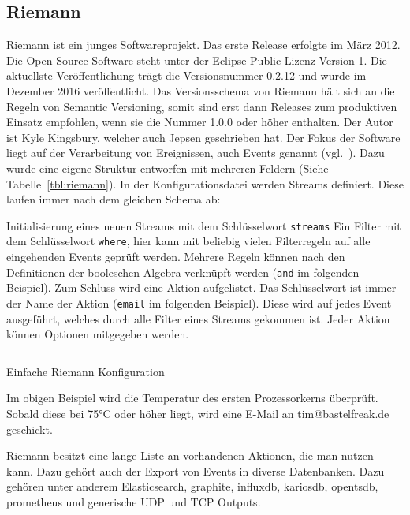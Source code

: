\subsection{Riemann}
Riemann ist ein junges Softwareprojekt. Das erste Release erfolgte im März
2012. Die Open-Source-Software steht unter der Eclipse Public Lizenz Version 1.
Die aktuellste Veröffentlichung trägt die Versionsnummer 0.2.12 und wurde im
Dezember 2016 veröffentlicht. Das Versionsschema von Riemann hält sich an die
Regeln von \gls{Semantic Versioning}, somit sind erst dann Releases zum
produktiven Einsatz empfohlen, wenn sie die Nummer 1.0.0 oder höher enthalten.
Der Autor ist Kyle Kingsbury, welcher auch \gls{Jepsen} geschrieben hat. Der
Fokus der Software liegt auf der Verarbeitung von Ereignissen, auch Events
genannt (vgl.~\cite{riemann_concepts}). Dazu wurde eine eigene Struktur
entworfen mit mehreren Feldern (Siehe Tabelle~\ref{tbl:riemann}). In der
Konfigurationsdatei werden Streams definiert. Diese laufen immer nach dem
gleichen Schema ab:

\begin{outline}
  \lstset{language=Clojure}
  \1 Initialisierung eines neuen Streams mit dem Schlüsselwort
  \lstinline|streams|
  \1 Ein Filter mit dem Schlüsselwort \lstinline|where|, hier kann mit beliebig
  vielen Filterregeln auf alle eingehenden Events geprüft werden. Mehrere
  Regeln können nach den Definitionen der booleschen Algebra verknüpft werden
  (\lstinline|and| im folgenden Beispiel).
  \1 Zum Schluss wird eine Aktion aufgelistet. Das Schlüsselwort ist immer der
  Name der Aktion (\lstinline|email| im folgenden Beispiel). Diese wird auf
  jedes Event ausgeführt, welches durch alle Filter eines Streams gekommen ist.
  Jeder Aktion können Optionen mitgegeben werden.
\end{outline}

\begin{listing}
  \inputminted{clojure}{../listings/riemann-config.txt}
  \caption{Einfache Riemann Konfiguration}
\end{listing}

Im obigen Beispiel wird die Temperatur des ersten Prozessorkerns überprüft.
Sobald diese bei 75°C oder höher liegt, wird eine E-Mail an tim@bastelfreak.de
geschickt.

Riemann besitzt eine lange Liste an vorhandenen Aktionen, die man nutzen kann.
Dazu gehört auch der Export von Events in diverse Datenbanken. Dazu gehören
unter anderem Elasticsearch, graphite, influxdb, kariosdb, opentsdb, prometheus
und generische UDP und TCP Outputs.

